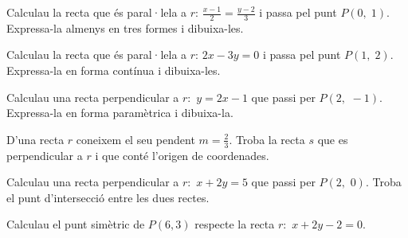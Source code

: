 \begin{mylist}
  	

 
\exer  Calculau la recta que és paral·lela a $r$: $\frac{x-1}{2} =\frac{y-2}{3} $ i passa pel punt $P\left(0,\; 1\right)$. Expressa-la almenys en tres formes i dibuixa-les.


\exer  Calculau la recta que és paral·lela a $r$: $2x-3y=0$ i passa pel punt $P\left(1,\; 2\right)$. Expressa-la en forma contínua i dibuixa-les.

 
\exer  Calculau una recta perpendicular a $r:$ $y=2x-1$ que passi per $P\left(2,\, \, -1\right)$. Expressa-la en forma paramètrica i dibuixa-la.


\exer D'una recta $r$ coneixem el seu pendent $m=\frac{2}{3}$. Troba la recta $s$ que es perpendicular a $r$ i que conté l'origen de coordenades.


\exer  Calculau una recta perpendicular a $r:$ $x+2y=5$ que passi per $P\left(2,\, \, 0\right)$. Troba el punt d'intersecció entre les dues rectes.
	
	
\exer  Calculau el punt simètric de $P(6,3)$ respecte la recta $r:$ $x+2y-2=0$.


\end{mylist}	

